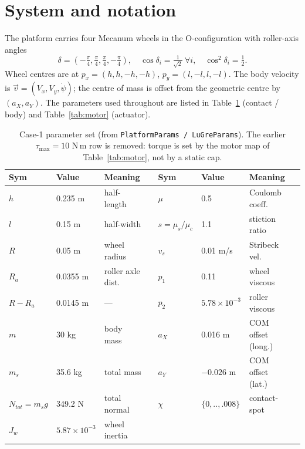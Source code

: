 \documentclass[11pt]{article}
\begin{document}
\section{System and notation}
The platform carries four Mecanum wheels in the O-configuration with roller-axis angles
\begin{equation}
\delta=\left(-\tfrac{\pi}{4},\tfrac{\pi}{4},\tfrac{\pi}{4},-\tfrac{\pi}{4}\right),\quad
\cos\delta_i=\tfrac{1}{\sqrt2}\ \forall i,\quad \cos^2\delta_i=\tfrac12 .
\end{equation}
Wheel centres are at $p_x=(h,h,-h,-h)$, $p_y=(l,-l,l,-l)$. The body velocity is
$\vec v=(V_x,V_y,\dot\psi)$; the centre of mass is offset from the geometric centre by
$(a_X,a_Y)$. The parameters used throughout are listed in Table~\ref{tab:params} (contact /
body) and Table~\ref{tab:motor} (actuator).

\begin{table}[h]\centering\small
\begin{tabular}{llll@{\hskip 2em}llll}
\toprule
Sym & Value & Meaning & & Sym & Value & Meaning\\
\midrule
$h$ & 0.235 m & half-length & & $\mu$ & 0.5 & Coulomb coeff.\\
$l$ & 0.15 m & half-width & & $s=\mu_s/\mu_c$ & 1.1 & stiction ratio\\
$R$ & 0.05 m & wheel radius & & $v_s$ & 0.01 m/s & Stribeck vel.\\
$R_a$ & 0.0355 m & roller axle dist. & & $p_1$ & 0.11 & wheel viscous\\
$R-R_a$ & 0.0145 m & --- & & $p_2$ & $5.78\!\times\!10^{-3}$ & roller viscous\\
$m$ & 30 kg & body mass & & $a_X$ & 0.016 m & COM offset (long.)\\
$m_s$ & 35.6 kg & total mass & & $a_Y$ & $-0.026$ m & COM offset (lat.)\\
$N_{tot}=m_s g$ & 349.2 N & total normal & & $\chi$ & $\{0,..,.008\}$ & contact-spot\\
$J_w$ & $5.87\!\times\!10^{-3}$ & wheel inertia & & & & \\
\bottomrule
\end{tabular}
\caption{Case-1 parameter set (from \texttt{PlatformParams / LuGreParams}). The earlier
$\tau_{\max}=10$ N\,m row is removed: torque is set by the motor map of
Table~\ref{tab:motor}, not by a static cap.}
\label{tab:params}
\end{table}
\end{document}
